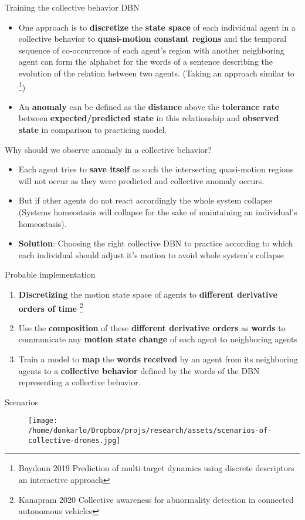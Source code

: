 \documentclass[unknownkeysallowed]{beamer}
\begin{document}
	\begin{frame}{Training the collective behavior DBN}
		\begin{itemize}
			\item One approach is to \textbf{discretize} the \textbf{state space} of each individual agent in a collective behavior to \textbf{quasi-motion constant regions} and the temporal sequence of co-occurrence of each agent's region with another neighboring agent can form the alphabet for the words of a sentence describing the evolution of the relation between two agents. (Taking an approach similar to \footnote{Baydoun 2019 Prediction of multi target dynamics using discrete descriptors an interactive approach})
			\item An \textbf{anomaly} can be defined as the \textbf{distance} above the \textbf{tolerance rate} between \textbf{expected/predicted state} in this relationship and \textbf{observed state} in comparison to practicing model.
		\end{itemize}
	\end{frame}

	\begin{frame}{Why should we observe anomaly in a collective behavior?}
		\begin{itemize}
			\item Each agent tries to \textbf{save itself} as such the intersecting quasi-motion regions will not occur as they were predicted and collective anomaly occurs. 
			\item But if other agents do not react accordingly the whole system collapse (Systems homeostasis will collapse for the sake of maintaining an individual's homeostasis).  
			\item \textbf{Solution}: Choosing the right collective DBN to practice according to which each individual should adjust it's motion to avoid whole system's collapse
		\end{itemize}
	\end{frame}

	\begin{frame}{Probable implementation}
		\begin{enumerate}
			\item  \textbf{Discretizing} the motion state space of agents to \textbf{different derivative orders of time} \footnote{Kanapram 2020 Collective awareness for abnormality detection in connected autonomous vehicles}
			\item Use the \textbf{composition} of these \textbf{different derivative orders} as \textbf{words} to communicate any \textbf{motion state change} of each agent to neighboring agents
			\item 	Train a model to \textbf{map} the \textbf{words} \textbf{received} by an agent from its neighboring agents to a \textbf{collective behavior} defined by the words of the DBN representing a collective behavior. 
		\end{enumerate}
	\end{frame}

	\begin{frame}{Scenarios}
		\begin{figure}
			\texttt{[image: /home/donkarlo/Dropbox/projs/research/assets/scenarios-of-collective-drones.jpg]}
			\caption{}
		\end{figure}
	\end{frame}
\end{document}

